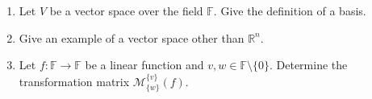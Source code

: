 \begin{enumerate}
		\item Let $V$ be a vector space over the field $\mathbb{F}$. Give the definition of a basis.
	\item Give an example of a vector space other than $\mathbb{R}^n$.
	\item Let $f\colon\mathbb{F} \to \mathbb{F}$ be a linear function and $v,w \in \mathbb{F}\setminus \{0\}$. Determine the transformation matrix $\mathcal{M}^{\{v\}}_{\{w\}}(f)$.
	
\end{enumerate}
 